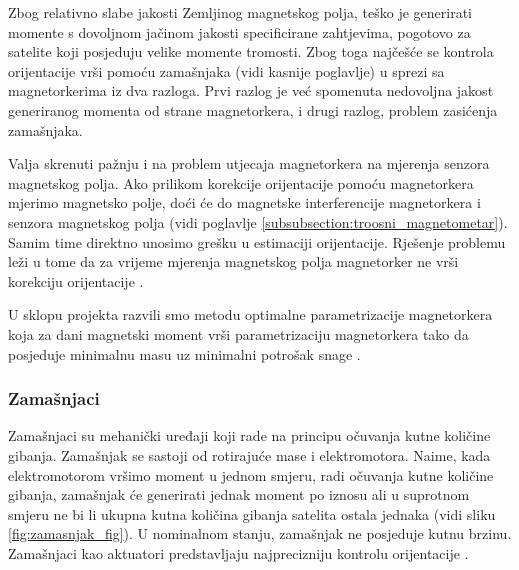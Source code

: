 \documentclass[times, utf8, diplomski, numeric]{templates/template}
\begin{document}
{{{{                Zbog relativno slabe jakosti Zemljinog magnetskog polja, teško je generirati momente s dovoljnom jačinom jakosti specificirane zahtjevima, pogotovo za satelite koji posjeduju velike momente tromosti. Zbog toga najčešće se kontrola orijentacije vrši pomoću zamašnjaka (vidi kasnije poglavlje) u sprezi sa magnetorkerima iz dva razloga. Prvi razlog je već spomenuta nedovoljna jakost generiranog momenta od strane magnetorkera, i drugi razlog, problem zasićenja zamašnjaka.

                Valja skrenuti pažnju i na problem utjecaja magnetorkera na mjerenja senzora magnetskog polja. Ako prilikom korekcije orijentacije pomoću magnetorkera mjerimo magnetsko polje, doći će do magnetske interferencije magnetorkera i senzora magnetskog polja (vidi poglavlje \ref{subsubsection:troosni_magnetometar}). Samim time direktno unosimo grešku u estimaciji orijentacije. Rješenje problemu leži u tome da za vrijeme mjerenja magnetskog polja magnetorker ne vrši korekciju orijentacije \cite{adcsKnjiga}.

                U sklopu projekta razvili smo metodu optimalne parametrizacije magnetorkera koja za dani magnetski moment vrši parametrizaciju magnetorkera tako da posjeduje minimalnu masu uz minimalni potrošak snage \cite{magnetorker_ieee}.
            }

            \subsubsection{Zamašnjaci }{
                Zamašnjaci su mehanički uređaji koji rade na principu očuvanja kutne količine gibanja. Zamašnjak se sastoji od rotirajuće mase i elektromotora. Naime, kada elektromotorom vršimo moment u jednom smjeru, radi očuvanja kutne količine gibanja, zamašnjak će generirati jednak moment po iznosu ali u suprotnom smjeru ne bi li ukupna kutna količina gibanja satelita ostala jednaka (vidi sliku \ref{fig:zamasnjak_fig}). U nominalnom stanju, zamašnjak ne posjeduje kutnu brzinu. Zamašnjaci kao aktuatori predstavljaju najprecizniju kontrolu orijentacije \cite{adcsKnjiga}.

}}}}
\end{document}
